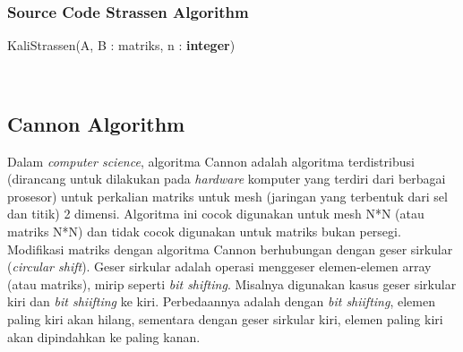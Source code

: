 \documentclass[conference]{IEEEtran}
\begin{document}
\subsubsection{Source Code Strassen Algorithm}
\begin{algorithm}
    \caption{KaliStrassen(A, B : matriks, n : \textbf{integer})}
    \\
\end{algorithm}

\subsection{Cannon Algorithm}
Dalam \textit{computer science}, algoritma Cannon adalah algoritma terdistribusi (dirancang untuk dilakukan pada \textit{hardware} komputer yang terdiri dari berbagai prosesor)
untuk perkalian matriks untuk mesh (jaringan yang terbentuk dari sel dan titik) 2 dimensi.
Algoritma ini cocok digunakan untuk mesh N*N (atau matriks N*N) dan tidak cocok digunakan untuk matriks bukan persegi.
Modifikasi matriks dengan algoritma Cannon berhubungan dengan geser sirkular (\textit{circular shift}).
Geser sirkular adalah operasi menggeser elemen-elemen array (atau matriks), mirip seperti \textit{bit shifting}.
Misalnya digunakan kasus geser sirkular kiri dan \textit{bit shiifting} ke kiri.
Perbedaannya adalah dengan \textit{bit shiifting}, elemen paling kiri akan hilang, 
sementara dengan geser sirkular kiri, elemen paling kiri akan dipindahkan ke paling kanan.
\end{document}
